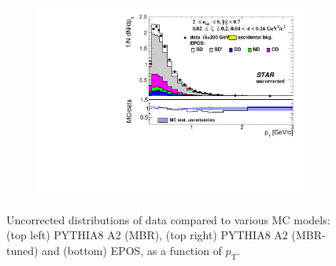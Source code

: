 \begin{figure}[H]
\begin{subfigure}{.45\textwidth}
		\includegraphics[width=\linewidth, page=1]{chapters/chrgSTAR/img/nonSD/chrg/SDT_epos_xi0_RP_starsim_pt.pdf}
	\end{subfigure}
	\begin{minipage}{.45\textwidth}
		\caption{Uncorrected distributions of data compared to various MC models: (top left) PYTHIA8 A2 (MBR), (top right) PYTHIA8 A2 (MBR-tuned) and (bottom) EPOS, as a function of $p_{\mathrm{T}}$.}
		\label{fig:nonSDpt}
	\end{minipage}
	
\end{figure}
\newpage
